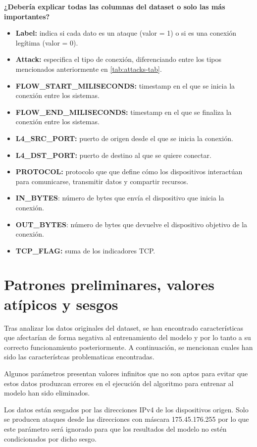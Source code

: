 \textbf{¿Debería explicar todas las columnas del dataset o solo las más importantes?}

\begin{itemize}
\item \textbf{Label:} indica si cada dato es un ataque (valor = 1) o si es una conexión legítima (valor = 0).
\item \textbf{Attack:} especifica el tipo de conexión, diferenciando entre los tipos mencionados anteriormente en \ref{tab:attacks-tab}.
\item\textbf{FLOW\_START\_MILISECONDS:} timestamp en el que se inicia la conexión entre los sistemas.
\item\textbf{FLOW\_END\_MILISECONDS:} timestamp en el que se finaliza la conexión entre los sistemas.
\item\textbf{L4\_SRC\_PORT:} puerto de origen desde el que se inicia la conexión.
\item\textbf{L4\_DST\_PORT:} puerto de destino al que se quiere conectar.
\item\textbf{PROTOCOL:} protocolo que que define cómo los dispositivos interactúan para comunicarse, transmitir datos y compartir recursos.
\item\textbf{IN\_BYTES}: número de bytes que envía el dispositivo que inicia la conexión.
\item\textbf{OUT\_BYTES}: número de bytes que devuelve el dispositivo objetivo de la conexión.
\item\textbf{TCP\_FLAG:} suma de los indicadores TCP.
\end{itemize}


\section{Patrones preliminares, valores atípicos y sesgos}

Tras analizar los datos originales del dataset, se han encontrado características que afectarían de forma negativa al entrenamiento del modelo y por lo tanto a su correcto funcionamiento posteriormente. A continuación, se mencionan cuales han sido las característcas problematicas encontradas.


Algunos parámetros presentan valores infinitos que no son aptos para evitar que estos datos produzcan errores en el ejecución del algoritmo para entrenar al modelo han sido eliminados.

Los datos están sesgados por las direcciones IPv4 de los dispositivos origen. Solo se producen ataques desde las direcciones con máscara 175.45.176.255 por lo que este parámetro será ignorado para que los resultados del modelo no estén condicionados por dicho sesgo.



